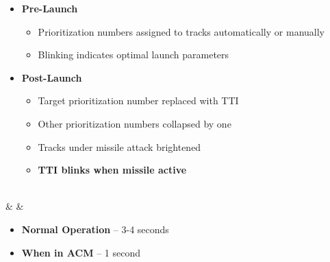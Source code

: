 \documentclass[fontInter]{TechCheck}
\begin{document}
\begin{listlongtable}
		\begin{minipage}[t]{\linewidth}
			\vspace{-7pt}
			\begin{itemize}
				\item \textbf{Pre-Launch}
				\begin{itemize}
					\item Prioritization numbers assigned to tracks automatically or manually
					\item Blinking indicates optimal launch parameters
				\end{itemize}
				\item \textbf{Post-Launch}
				\begin{itemize}
					\item Target prioritization number replaced with TTI
					\item Other prioritization numbers collapsed by one
					\item Tracks under missile attack brightened
					\item \textbf{TTI blinks when missile active}
				\end{itemize}
			\end{itemize}
		\end{minipage} \\
		\midrule
		\textbf{\textbullet} &  &
		\begin{minipage}[t]{\linewidth}
			\vspace{-7pt}
			\begin{itemize}
				\item \textbf{Normal Operation} -- 3-4 seconds
				\item \textbf{When in ACM} -- 1 second
			\end{itemize}
		\end{minipage} \\
	\end{listlongtable}
\end{document}
